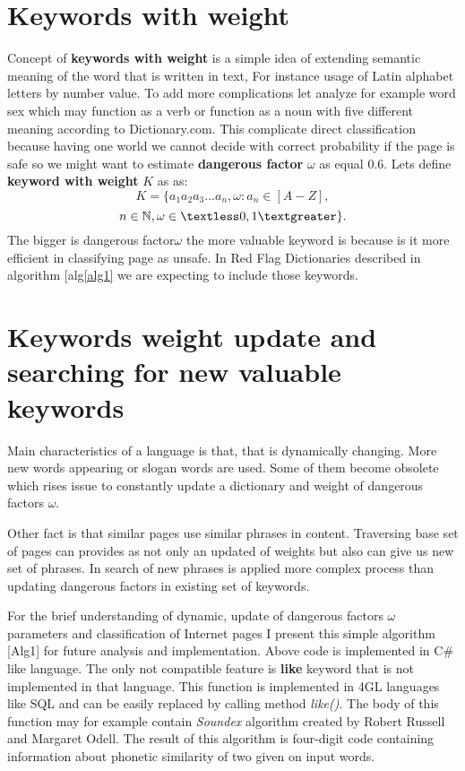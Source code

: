 \documentclass[9pt,a4paper]{extarticle}
\begin{document}
\begin{multicols}{2}
\section{Keywords with weight}
Concept of \textbf{keywords with weight} is a simple idea of extending semantic meaning of the word that is written in text, For instance usage of Latin alphabet letters by number value. To add more complications let analyze for example word sex which may function as a verb or function as a noun with five different meaning according to Dictionary.com\cite{noauthor_dictionary.com_2018}. This complicate direct classification because having one world we cannot decide with correct probability if the page is safe so we might want to estimate \textbf{dangerous factor} \(\omega\) as equal 0.6. Lets define \textbf{keyword with weight} \(K\) as as:
$$
K = \{a_1a_2a_3...a_n, \omega : a_n \in [A-Z], 
$$
$$
n \in \mathbb{N}, \omega \in \textless0,1\textgreater\}.
$$
The bigger is dangerous factor\(\omega\) the more valuable keyword is because is it more efficient in classifying page as unsafe. In Red Flag Dictionaries described in algorithm [alg\ref{alg1} we are expecting to include those keywords.

\section{Keywords weight update and searching for new valuable keywords}
Main characteristics of a language is that, that  is dynamically changing. More  new words appearing or slogan words are used. Some of them  become obsolete which rises issue to constantly update a dictionary and weight of dangerous factors \(\omega\).

Other fact is that similar pages use similar phrases in content. Traversing base set of pages can provides as not only an updated of weights but also can give us new set of phrases. In search of new phrases is applied more complex process than updating dangerous factors in existing set of keywords.

For the brief understanding of dynamic, update of dangerous factors \(\omega\) parameters and classification of Internet pages I present this simple algorithm [Alg1] for future analysis and implementation. Above code is implemented in C\#\cite{andrew_troelsen_jezyk_2011} like language. The only not compatible feature is \textbf{like} keyword that is not implemented in that language. This function is implemented in 4GL languages like SQL and can be easily replaced by calling method \textit{like()}. The body of this function may for example contain \textit{Soundex} algorithm created by Robert Russell and Margaret Odell\cite{donald_e._knuth_art_2002}. The result of this algorithm is four-digit code containing information about phonetic similarity of two given on input words.


\end{multicols}
\end{document}
